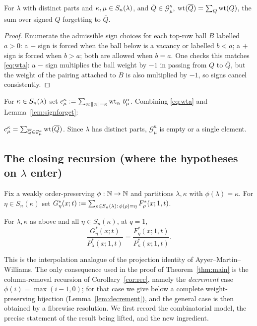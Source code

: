 \begin{qthreelemma}\label{lem:signforget}
For $\lambda$ with distinct parts and $\kappa,\mu\in S_n(\lambda)$, and $\overline Q\in\mathcal G^\kappa_\mu$,
$\operatorname{wt}(\overline Q)=\sum_Q\operatorname{wt}(Q)$, the sum over signed $Q$ forgetting to $\overline Q$.
\end{qthreelemma}

\begin{proof}
Enumerate the admissible sign choices for each top-row ball $B$ labelled $a>0$:
a $-$ sign is forced when the ball below is a vacancy or labelled $b<a$; a $+$
sign is forced when $b>a$; both are allowed when $b=a$. One checks this matches
\eqref{eq:wta}: a $-$ sign multiplies the ball weight by $-1$ in passing from
$Q$ to $\overline Q$, but the weight of the pairing attached to $B$ is also
multiplied by $-1$, so signs cancel consistently.
\end{proof}

For $\kappa\in S_n(\lambda)$ set $c^\kappa_\mu:=\sum_{\alpha:\|\alpha\|=\kappa}\operatorname{wt}_\alpha\,b^\alpha_\mu$.
Combining \eqref{eq:wta} and Lemma~\ref{lem:signforget}:

\begin{qthreelemma}\label{lem:ckm}
$c^\kappa_\mu=\sum_{\overline Q\in\mathcal G^\kappa_\mu}\operatorname{wt}(\overline Q)$. Since $\lambda$ has distinct
parts, $\mathcal G^\kappa_\mu$ is empty or a single element.
\end{qthreelemma}

\subsection*{The closing recursion (where the hypotheses on $\lambda$ enter)}

Fix a weakly order-preserving $\phi:\mathbb{N}\to\mathbb{N}$ and partitions $\lambda,\kappa$ with
$\phi(\lambda)=\kappa$. For $\eta\in S_n(\kappa)$ set
$G^*_\eta(x;t):=\sum_{\rho\in S_n(\lambda):\,\phi(\rho)=\eta}F^*_\rho(x;1,t)$.

\begin{qthreetheorem}\label{thm:G}
For $\lambda,\kappa$ as above and all $\eta\in S_n(\kappa)$, at $q=1$,
\[
\frac{G^*_\eta(x;t)}{P^*_\lambda(x;1,t)}=\frac{F^*_\eta(x;1,t)}{P^*_\kappa(x;1,t)} .
\]
\end{qthreetheorem}

This is the interpolation analogue of the projection identity of
Ayyer--Martin--Williams. The only consequence used in the proof of
Theorem~\ref{thm:main} is the column-removal recursion of
Corollary~\ref{cor:rec}, namely the \emph{decrement} case $\phi(i)=\max(i-1,0)$;
for that case we give below a complete weight-preserving bijection
(Lemma~\ref{lem:decrement}), and the general case is then obtained by a fibrewise
resolution. We first record the combinatorial model, the precise statement of the
result being lifted, and the new ingredient.

